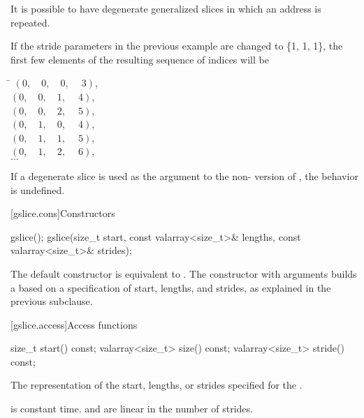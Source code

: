 \pnum
It is possible to have degenerate generalized slices in which an address
is repeated.

\pnum
\begin{example}
If the stride parameters in the previous
example are changed to \{1, 1, 1\}, the first few elements of the
resulting sequence of indices will be

\begin{tabbing}
\hspace{.9in}\=\kill%
\>$(0,\quad 0,\quad 0,\quad \ 3)$,  \\
\>$(0,\quad 0,\quad 1,\quad \ 4)$,  \\
\>$(0,\quad 0,\quad 2,\quad \ 5)$,  \\
\>$(0,\quad 1,\quad 0,\quad \ 4)$,  \\
\>$(0,\quad 1,\quad 1,\quad \ 5)$,  \\
\>$(0,\quad 1,\quad 2,\quad \ 6)$,  \\
\>$\ldots$
\end{tabbing}
\end{example}

\pnum
If a degenerate slice is used as the argument to the
non-
version of
,
the behavior is undefined.
%

[gslice.cons]{Constructors}

%
\begin{itemdecl}
gslice();
gslice(size_t start, const valarray<size_t>& lengths,
       const valarray<size_t>& strides);
\end{itemdecl}

\begin{itemdescr}
\pnum
The default constructor is equivalent to
.
The constructor with arguments builds a
based on a specification of start, lengths, and strides, as explained
in the previous subclause.
\end{itemdescr}

[gslice.access]{Access functions}

%
%
%
\begin{itemdecl}
size_t           start()  const;
valarray<size_t> size() const;
valarray<size_t> stride() const;
\end{itemdecl}

\begin{itemdescr}
\pnum
\returns
The representation of the
start, lengths, or strides specified for the .

\pnum
\complexity
{} is constant time.  and 
are linear in the number of strides.
\end{itemdescr}

